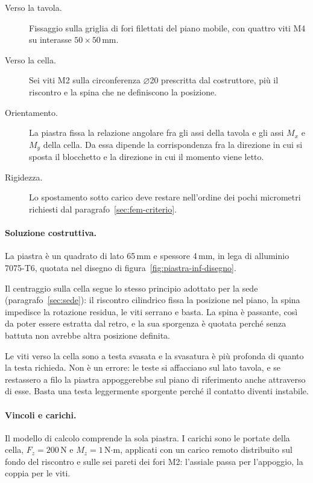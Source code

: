\begin{description}
  \item[Verso la tavola.] Fissaggio sulla griglia di fori filettati del piano
    mobile, con quattro viti M4 su interasse $50 \times 50$\,mm.
  \item[Verso la cella.] Sei viti M2 sulla circonferenza $\varnothing$20
    prescritta dal costruttore, più il riscontro e la spina che ne definiscono
    la posizione.
  \item[Orientamento.] La piastra fissa la relazione angolare fra gli assi della
    tavola e gli assi $M_x$ e $M_y$ della cella. Da essa dipende la
    corrispondenza fra la direzione in cui si sposta il blocchetto e la
    direzione in cui il momento viene letto.
  \item[Rigidezza.] Lo spostamento sotto carico deve restare nell'ordine dei
    pochi micrometri richiesti dal paragrafo~\ref{sec:fem-criterio}.
\end{description}

\paragraph{Soluzione costruttiva.}
La piastra è un quadrato di lato 65\,mm e spessore 4\,mm, in lega di alluminio
7075-T6, quotata nel disegno di figura~\ref{fig:piastra-inf-disegno}.

Il centraggio sulla cella segue lo stesso principio adottato per la sede
(paragrafo~\ref{sec:sede}): il riscontro cilindrico fissa la posizione nel
piano, la spina impedisce la rotazione residua, le viti serrano e basta. La
spina è passante, così da poter essere estratta dal retro, e la sua sporgenza è
quotata perché senza battuta non avrebbe altra posizione definita.

Le viti verso la cella sono a testa svasata e la svasatura è più profonda di
quanto la testa richieda. Non è un errore: le teste si affacciano sul lato
tavola, e se restassero a filo la piastra appoggerebbe sul piano di riferimento
anche attraverso di esse. Basta una testa leggermente sporgente perché il
contatto diventi instabile.

\paragraph{Vincoli e carichi.}
Il modello di calcolo comprende la sola piastra. I carichi sono le portate della
cella, $F_z = 200$\,N e $M_z = 1$\,N$\cdot$m, applicati con un carico remoto
distribuito sul fondo del riscontro e sulle sei pareti dei fori M2: l'assiale
passa per l'appoggio, la coppia per le viti.

